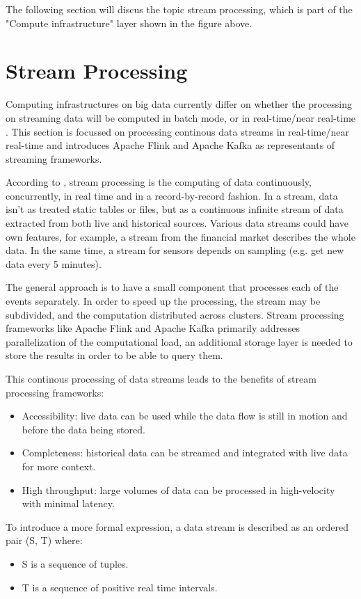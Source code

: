 The following section will discus the topic stream processing, which is part of the
"Compute infrastructure" layer shown in the figure above.

\section{Stream Processing}

Computing infrastructures on big data currently differ on whether the processing on streaming data
will be computed in batch mode, or in real-time/near real-time . This section is focussed on processing
continous data streams in real-time/near real-time and introduces Apache Flink and Apache Kafka as
representants of streaming frameworks.

According to \cite{Klepp16}, stream processing is the computing of data continuously,
concurrently, in real time and in a record-by-record fashion. In a stream, data isn't as treated static tables
or files, but as a continuous infinite stream of data extracted from both live and historical
sources. Various data streams could have own features, for example, a stream
from the financial market describes the whole data. In the same time, a stream for sensors
depends on sampling (e.g. get new data every 5 minutes).

The general approach is to have a small component that processes each of the events
separately. In order to speed up the processing, the stream may be subdivided, and the
computation distributed across clusters. Stream processing frameworks like Apache Flink and
Apache Kafka primarily addresses parallelization of the computational load, an additional storage
layer is needed to store the results in order to be able to query them.

This continous processing of data streams leads to the benefits of stream processing frameworks:

\begin{itemize}
	\item Accessibility: live data can be used while the data flow is still in motion and before the data being stored.
	\item Completeness: historical data can be streamed and integrated with live data for more context.
	\item High throughput: large volumes of data can be processed in high-velocity with minimal latency.
\end{itemize}

To introduce a more formal expression, a data stream is described as an ordered pair (S, T) where:
\begin{itemize}
	\item S is a sequence of tuples.
	\item T is a sequence of positive real time intervals.
\end{itemize}

